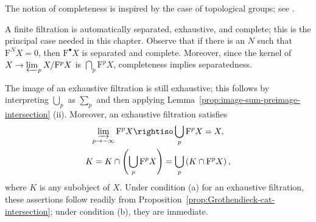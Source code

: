The notion of completeness is inspired by the case of topological groups; see
\cite[\S 4.10]{Li1}.

A finite filtration is automatically separated, exhaustive, and complete;
this is the principal case needed in this chapter. Observe that if there is an
$N$ such that $\mathrm{F}^NX=0$, then $\mathrm{F}^\bullet X$ is separated and
complete. Moreover, since the kernel of
$X\to\varprojlim_pX/\mathrm{F}^pX$ is $\bigcap_p\mathrm{F}^pX$,
completeness implies separatedness.

The image of an exhaustive filtration is still exhaustive; this follows by
interpreting $\bigcup_p$ as $\sum_p$ and then applying
Lemma~\ref{prop:image-sum-preimage-intersection} (ii). Moreover, an exhaustive
filtration satisfies
\begin{equation}\label{eqn:exhaustion-intersection}\begin{gathered}
	\varinjlim_{p \to -\infty} \mathrm{F}^p X \rightiso \bigcup_p \mathrm{F}^p X = X, \\
	K = K \cap \left( \bigcup_p \mathrm{F}^p X \right) = \bigcup_p \left( K \cap \mathrm{F}^p X \right),
\end{gathered}\end{equation}
where $K$ is any subobject of $X$. Under condition (a) for an exhaustive
filtration, these assertions follow readily from
Proposition~\ref{prop:Grothendieck-cat-intersection}; under condition (b), they
are immediate.


